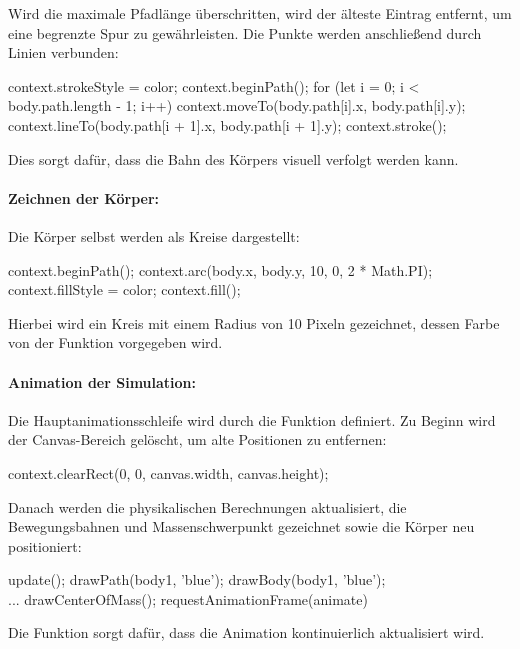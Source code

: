 \documentclass[a4paper,12pt,twoside]{article}
\begin{document}
Wird die maximale Pfadlänge überschritten, wird der älteste Eintrag entfernt, um eine begrenzte Spur zu gewährleisten. Die Punkte werden anschließend durch Linien verbunden:

\begin{javascript}
context.strokeStyle = color;
context.beginPath();
for (let i = 0; i < body.path.length - 1; i++) {
    context.moveTo(body.path[i].x, body.path[i].y);
    context.lineTo(body.path[i + 1].x, body.path[i + 1].y);
}
context.stroke();
\end{javascript}

Dies sorgt dafür, dass die Bahn des Körpers visuell verfolgt werden kann.

\paragraph{Zeichnen der Körper:}
Die Körper selbst werden als Kreise dargestellt:

\begin{javascript}
context.beginPath();
context.arc(body.x, body.y, 10, 0, 2 * Math.PI);
context.fillStyle = color;
context.fill();
\end{javascript}

Hierbei wird ein Kreis mit einem Radius von 10 Pixeln gezeichnet, dessen Farbe von der Funktion vorgegeben wird.

\paragraph{Animation der Simulation:}
Die Hauptanimationsschleife wird durch die Funktion  definiert. Zu Beginn wird der Canvas-Bereich gelöscht, um alte Positionen zu entfernen:

\begin{javascript}
context.clearRect(0, 0, canvas.width, canvas.height);
\end{javascript}

Danach werden die physikalischen Berechnungen aktualisiert, die Bewegungsbahnen und Massenschwerpunkt gezeichnet sowie die Körper neu positioniert:

\begin{javascript}
update();
drawPath(body1, 'blue');
drawBody(body1, 'blue');
\\...
drawCenterOfMass();
requestAnimationFrame(animate)
\end{javascript}

Die Funktion  sorgt dafür, dass die Animation kontinuierlich aktualisiert wird.
\end{document}
